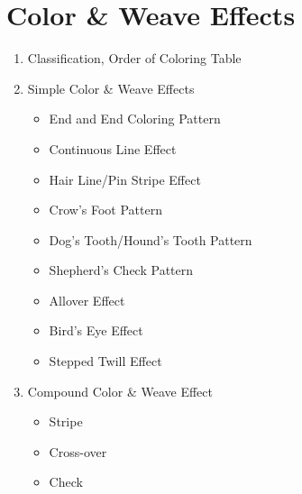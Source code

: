 \section{Color \& Weave Effects}

\begin{enumerate}[label=\textbf{\Alph*.}]
    \item Classification, Order of Coloring Table
    \item Simple Color \& Weave Effects
\begin{itemize}
    \item End and End Coloring Pattern
    \item Continuous Line Effect
    \item Hair Line/Pin Stripe Effect
    \item Crow's Foot Pattern
    \item Dog's Tooth/Hound's Tooth Pattern
    \item Shepherd's Check Pattern
    \item Allover Effect
    \item Bird's Eye Effect
    \item Stepped Twill Effect
\end{itemize}
    \item Compound Color \& Weave Effect
\begin{itemize}
    \item Stripe
    \item Cross-over
    \item Check
\end{itemize}
\end{enumerate}
